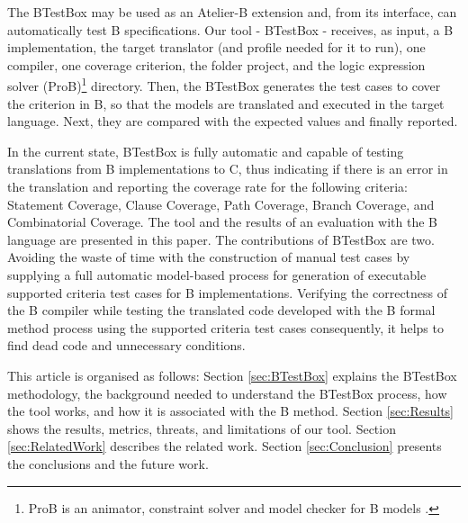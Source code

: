 \documentclass[runningheads]{llncs}
\begin{document}
The BTestBox may be used as an Atelier-B extension and, from its interface, can automatically test B specifications. Our tool - BTestBox - receives, as input, a B implementation, the target translator (and profile needed for it to run), one compiler, one coverage criterion, the folder project, and the logic expression solver (ProB)\footnote{ProB is an animator, constraint solver and model checker for B models \cite{1_leuschel_2017}.} directory. Then, the BTestBox generates the test cases to cover the criterion in B, so that the models are translated and executed in the target language. Next, they are compared with the expected values and finally reported. %

In the current state, BTestBox is fully automatic and capable of testing translations from B implementations to C, thus indicating if there is an error in the translation and reporting the coverage rate for the following criteria: Statement Coverage, Clause Coverage, Path Coverage, Branch Coverage, and Combinatorial Coverage. 
The tool and the results of an evaluation with the B language are presented in this paper. The contributions of BTestBox are two. Avoiding the waste of time with the construction of manual test cases by supplying a full automatic model-based process for generation of executable supported criteria test cases for B implementations.%
Verifying the correctness of the B compiler while testing the translated code developed with the B formal method process using the supported criteria test cases consequently, it helps to find dead code and unnecessary conditions.

This article is organised as follows: %
Section \ref{sec:BTestBox} explains the BTestBox methodology, the background needed to understand the BTestBox process, how the tool works, and how it is associated with the B method. Section \ref{sec:Results} shows the results, metrics, threats, and limitations of our tool. Section \ref{sec:RelatedWork} describes the related work. Section \ref{sec:Conclusion} presents the conclusions and the future work.
\end{document}
